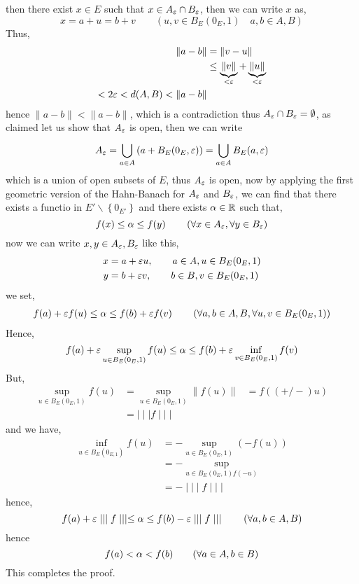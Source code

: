 \documentclass{report}
\begin{document}
then there exist $x \in  E $ such that $x \in  A_{\varepsilon }
\cap B_{\varepsilon }$, then we can write $x $ as,
\[
x = a + u = b + v
\quad \quad (u,v\in  B_{E}(0_{E},1)\quad a,b \in  A,B)
\] 
Thus, 
\begin{align*}
	\| a-b \|  &=
	\| v-u \|  \\
		   & \leq 
		   \underbrace{
	\| v \| 
		   }_{ <  \varepsilon }  + 
		   \underbrace{
	\| u \| 
		   }_{ <  \varepsilon } \\
		  < 2 \varepsilon  <  
		  d(A,B)  < 
		  \| a-b \| 
\end{align*}
hence $\| a-b \| <  \| a-b \|  $, which is a contradiction
thus $A_{\varepsilon } \cap B_{\varepsilon } = \emptyset  $, 
as claimed let us show that $A_{\varepsilon } $ 
is open, then we can write 
\[
A_{\varepsilon }= 
\bigcup_{ a \in  A}^{}  
\left( 
	a + B_{E}(0_{E}, \varepsilon ) 
\right) = 
\bigcup_{ a \in  A}^{}  
B_{E}(a, \varepsilon ) 
\] 
which is a union of open subsets of $E$, thus 
$A_{\varepsilon } $ is open, now by applying the first 
geometric version of the Hahn-Banach for $A_{\varepsilon } $ 
and $B_{\varepsilon } $, we can find that there exists 
a functio in $E' \backslash \left\{ 0_{E '} \right\} $  and
there exists $\alpha \in  \mathbb{R}  $  such that, 
\[
f(x) \leq \alpha \leq f(y)  \quad 
\quad 
\left( 
	\forall x \in  A_{\varepsilon },
	\forall y \in B_{\varepsilon }
\right)
\]
now we can write $x,y \in  A_{\varepsilon },B_{\varepsilon } $  like this, 
\begin{align*}
	x &= 
	a + \varepsilon u , \quad \quad a \in  A, u \in 
	B_E(0_{E},1)  \\
	y &= b + \varepsilon v, \quad \quad 
	b \in  B, v \in  B_{E}(0_{E},1) 
\end{align*}
we set, 
\begin{align*}
f(a) + \varepsilon f(u)  \leq 
\alpha 
\leq f(b) + \varepsilon f(v) 
\quad 
\quad 
\left( 
	\forall a,b \in A,B, 
	\forall u,v \in  B_{E}(0_{E},1) 
\right)
\end{align*}
Hence, 
\[
	f(a)  + \varepsilon 
	\sup_{u \in  B_{E}(0_{E},1) }  
	f(u) \leq 
	\alpha \leq 
	f(b) + \varepsilon 
	\inf_{v \in  B_{E}(0_{E},1) }  
	f(v) 
\]
But, 
\begin{align*}
	\sup_{u \in  B_{E}(0_{E},1) }  
	f(u) &=
	\sup_{u \in  B_{E}(0_{E},1) }  
	\| f(u)  \|  &= 
	f( (+/-)  u)  \\
		     &= \mid \mid \mid  f \mid \mid \mid 
\end{align*}
and we have, 
\begin{align*}
\inf_{u \in  B_{E}(0_{E,1}) }  
f(u)  &=
- \sup_{u \in  B_{E}(0_{E},1) }  
(-f(u) )  \\
      &= -\sup_{u \in  B_{E}(0_{E},1)f(-u)  }  \\
      &= - \mid \mid \mid f  \mid \mid \mid 
 \end{align*}
 hence, 
 \[
 f(a) + \varepsilon 
 \mid \mid \mid  f \mid \mid \mid  \leq 
 \alpha \leq 
 f(b) - \varepsilon \mid \mid \mid  f \mid \mid \mid   
 \quad \quad 
	\left( 
		\forall a,b \in A,B
	\right)
 \]
hence 
\[
f(a) <  \alpha <  f(b)  \quad \quad 
(\forall  a \in  A, b \in  B) 
\]
This completes the proof.
\newpage
\end{document}
